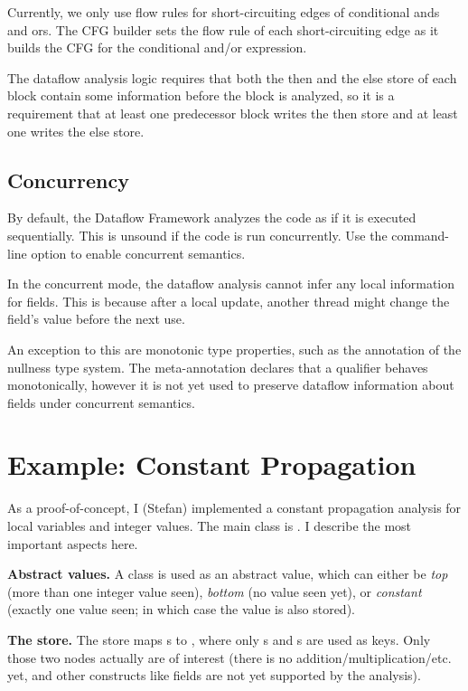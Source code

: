 Currently, we only use flow rules for short-circuiting edges of
conditional ands and ors.  The CFG builder sets the flow rule of each
short-circuiting edge as it builds the CFG for the conditional and/or
expression.

The dataflow analysis logic requires that both the then and the else
store of each block contain some information before the block is
analyzed, so it is a requirement that at least one predecessor block
writes the then store and at least one writes the else store.


\subsection{Concurrency}

By default, the Dataflow Framework analyzes the code as if it is
executed sequentially.  This is unsound if the code is run
concurrently.  Use the  command-line
option to enable concurrent semantics.

In the concurrent mode, the dataflow analysis cannot infer any
local information for fields.  This is because after a local update,
another thread might change the field's value before the next use.

An exception to this are monotonic type properties, such as the
 annotation of the nullness type system.  The
meta-annotation  declares that a qualifier
behaves monotonically, however it is not yet used to preserve dataflow
information about fields under concurrent semantics.


\section{Example: Constant Propagation}

As a proof-of-concept, I (Stefan) implemented a constant propagation
analysis for local variables and integer values.  The main class is
.  I
describe the most important aspects here.

\textbf{Abstract values.} A class  is used as an
abstract value, which can either be \emph{top} (more than one integer
value seen), \emph{bottom} (no value seen yet), or \emph{constant}
(exactly one value seen; in which case the value is also stored).

\textbf{The store.} The store maps s to ,
where only s and s
are used as keys.  Only those two nodes actually are of interest
(there is no addition/multiplication/etc. yet, and other constructs
like fields are not yet supported by the analysis).

